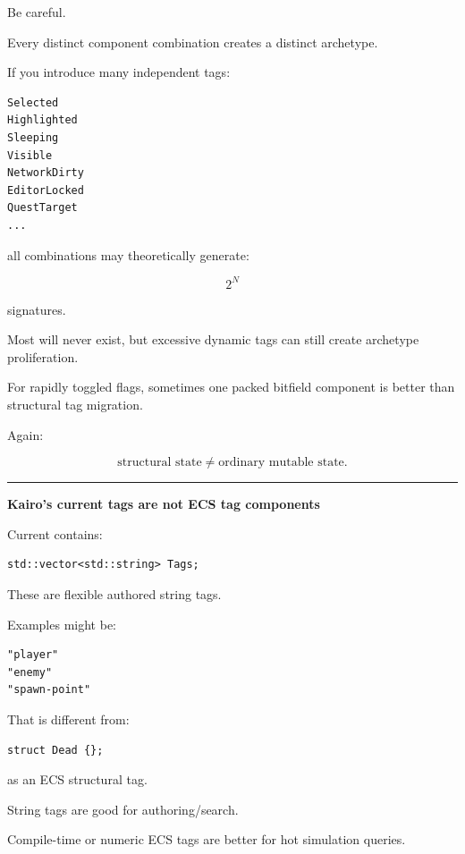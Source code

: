 Be careful.

Every distinct component combination creates a distinct archetype.

If you introduce many independent tags:

\begin{verbatim}
Selected
Highlighted
Sleeping
Visible
NetworkDirty
EditorLocked
QuestTarget
...
\end{verbatim}

all combinations may theoretically generate:

\[
2^N
\]

signatures.

Most will never exist, but excessive dynamic tags can still create archetype proliferation.

For rapidly toggled flags, sometimes one packed bitfield component is better than structural tag migration.

Again:

\[
\boxed{
\text{structural state}
\neq
\text{ordinary mutable state}.
}
\]

\begin{center}\rule{0.5\linewidth}{0.5pt}\end{center}

\textbf{Kairo's current tags are not ECS tag components}

Current  contains:

\begin{verbatim}
std::vector<std::string> Tags;
\end{verbatim}

These are flexible authored string tags.

Examples might be:

\begin{verbatim}
"player"
"enemy"
"spawn-point"
\end{verbatim}

That is different from:

\begin{verbatim}
struct Dead {};
\end{verbatim}

as an ECS structural tag.

String tags are good for authoring/search.

Compile-time or numeric ECS tags are better for hot simulation queries.

